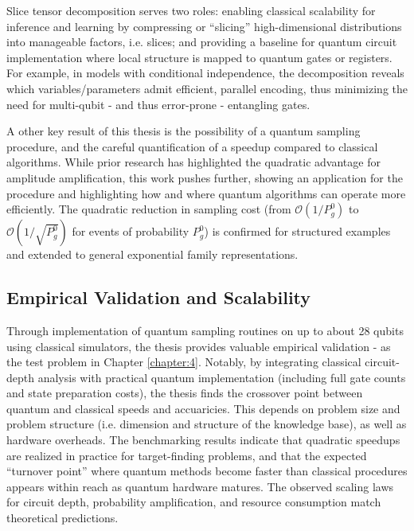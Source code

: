 \documentclass[encoding=utf8,british]{tumphthesis}
\begin{document}
        Slice tensor decomposition serves two roles: enabling classical scalability for inference and learning by compressing or “slicing” high-dimensional distributions into manageable factors, 
        i.e. slices; and providing a baseline for quantum circuit implementation where local structure is mapped to quantum gates or registers. For example, in models with conditional 
        independence, the decomposition reveals which variables/parameters admit efficient, parallel encoding, thus minimizing the need for multi-qubit - and thus error-prone - entangling gates.

        A other key result of this thesis is the possibility of a quantum sampling procedure, and the careful quantification of a speedup compared to classical algorithms. While prior research has highlighted the quadratic 
        advantage for amplitude amplification, this work pushes further, showing an application for the procedure and highlighting how and where quantum algorithms can operate more efficiently. The 
        quadratic reduction in sampling cost (from $\mathcal{O}(1/P_g^0)$ to $\mathcal{O}(1/\sqrt{P_g^0})$ for events of probability $P_g^0$) is confirmed for structured examples 
        and extended to general exponential family representations.

        \subsection*{Empirical Validation and Scalability}
        Through implementation of quantum sampling routines on up to about 28 qubits using classical simulators, the thesis provides valuable 
        empirical validation  - as the test problem in Chapter \ref{chapter:4}. 
        Notably, by integrating classical circuit-depth analysis with practical quantum implementation (including full gate counts and state preparation costs), the thesis 
        finds the crossover point between quantum and classical speeds and accuaricies. This depends on problem size and problem structure (i.e. dimension and structure of the knowledge base), as well as hardware overheads.
        The benchmarking results indicate that quadratic speedups are realized in practice for target-finding problems, and that the expected “turnover point” where quantum methods become faster than 
        classical procedures appears within reach as quantum hardware matures. The observed scaling laws for circuit depth, probability amplification, and resource consumption match theoretical predictions.
 
\end{document}
